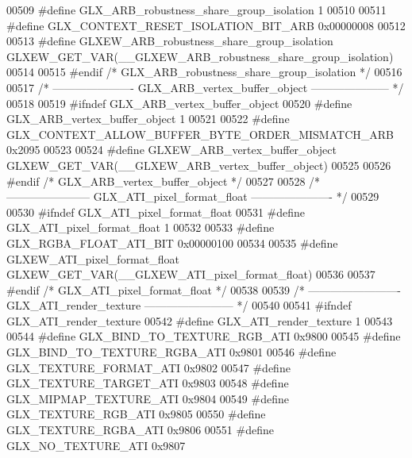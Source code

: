 \begin{DoxyCode}
00509 \textcolor{preprocessor}{#define GLX\_ARB\_robustness\_share\_group\_isolation 1}
00510 
00511 \textcolor{preprocessor}{#define GLX\_CONTEXT\_RESET\_ISOLATION\_BIT\_ARB 0x00000008}
00512 
00513 \textcolor{preprocessor}{#define GLXEW\_ARB\_robustness\_share\_group\_isolation
       GLXEW\_GET\_VAR(\_\_GLXEW\_ARB\_robustness\_share\_group\_isolation)}
00514 
00515 \textcolor{preprocessor}{#endif }\textcolor{comment}{/* GLX\_ARB\_robustness\_share\_group\_isolation */}\textcolor{preprocessor}{}
00516 
00517 \textcolor{comment}{/* ---------------------- GLX\_ARB\_vertex\_buffer\_object --------------------- */}
00518 
00519 \textcolor{preprocessor}{#ifndef GLX\_ARB\_vertex\_buffer\_object}
00520 \textcolor{preprocessor}{#define GLX\_ARB\_vertex\_buffer\_object 1}
00521 
00522 \textcolor{preprocessor}{#define GLX\_CONTEXT\_ALLOW\_BUFFER\_BYTE\_ORDER\_MISMATCH\_ARB 0x2095}
00523 
00524 \textcolor{preprocessor}{#define GLXEW\_ARB\_vertex\_buffer\_object GLXEW\_GET\_VAR(\_\_GLXEW\_ARB\_vertex\_buffer\_object)}
00525 
00526 \textcolor{preprocessor}{#endif }\textcolor{comment}{/* GLX\_ARB\_vertex\_buffer\_object */}\textcolor{preprocessor}{}
00527 
00528 \textcolor{comment}{/* ----------------------- GLX\_ATI\_pixel\_format\_float ---------------------- */}
00529 
00530 \textcolor{preprocessor}{#ifndef GLX\_ATI\_pixel\_format\_float}
00531 \textcolor{preprocessor}{#define GLX\_ATI\_pixel\_format\_float 1}
00532 
00533 \textcolor{preprocessor}{#define GLX\_RGBA\_FLOAT\_ATI\_BIT 0x00000100}
00534 
00535 \textcolor{preprocessor}{#define GLXEW\_ATI\_pixel\_format\_float GLXEW\_GET\_VAR(\_\_GLXEW\_ATI\_pixel\_format\_float)}
00536 
00537 \textcolor{preprocessor}{#endif }\textcolor{comment}{/* GLX\_ATI\_pixel\_format\_float */}\textcolor{preprocessor}{}
00538 
00539 \textcolor{comment}{/* ------------------------- GLX\_ATI\_render\_texture ------------------------ */}
00540 
00541 \textcolor{preprocessor}{#ifndef GLX\_ATI\_render\_texture}
00542 \textcolor{preprocessor}{#define GLX\_ATI\_render\_texture 1}
00543 
00544 \textcolor{preprocessor}{#define GLX\_BIND\_TO\_TEXTURE\_RGB\_ATI 0x9800}
00545 \textcolor{preprocessor}{#define GLX\_BIND\_TO\_TEXTURE\_RGBA\_ATI 0x9801}
00546 \textcolor{preprocessor}{#define GLX\_TEXTURE\_FORMAT\_ATI 0x9802}
00547 \textcolor{preprocessor}{#define GLX\_TEXTURE\_TARGET\_ATI 0x9803}
00548 \textcolor{preprocessor}{#define GLX\_MIPMAP\_TEXTURE\_ATI 0x9804}
00549 \textcolor{preprocessor}{#define GLX\_TEXTURE\_RGB\_ATI 0x9805}
00550 \textcolor{preprocessor}{#define GLX\_TEXTURE\_RGBA\_ATI 0x9806}
00551 \textcolor{preprocessor}{#define GLX\_NO\_TEXTURE\_ATI 0x9807}

\end{DoxyCode}
